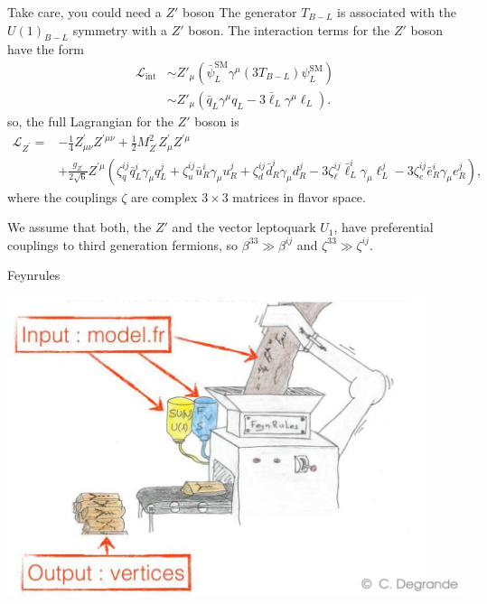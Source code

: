 \documentclass{../bredelebeamer}
\begin{document}
\begin{frame}{Take care, you could need a $Z'$ boson}
	The generator $T_{B-L}$ is associated with the $U(1)_{B-L}$ symmetry with a $Z'$ boson. The interaction terms for the $Z'$ boson have the form
	\begin{align*}
		\mathcal{L}_{\text{int}} &\sim Z'_\mu\left(\bar{\psi}_{L}^{\mathrm{SM}}\gamma^\mu (3T_{B-L}) \psi_{L}^{\mathrm{SM}}\right)\\
		&\sim Z'_\mu \left(\bar q_{L} \gamma^\mu q_{L} - 3 \bar \ell_L \gamma^\mu \ell_L\right).
	\end{align*}\pause
	so, the full Lagrangian for the $Z'$ boson is
	\begin{equation}
		\begin{aligned}
		\mathcal{L}_{Z^{\prime}}= & -\frac{1}{4} Z_{\mu \nu}^{\prime} Z^{\prime \mu \nu} +\frac{1}{2} M_{Z^{\prime}}^2 Z_\mu^{\prime} Z^{\prime \mu} \\
		& +\frac{g_{Z^{\prime}} }{2 \sqrt{6}} Z^{\prime \mu}\left(\zeta_q^{i j} \bar{q}_L^i \gamma_\mu q_L^j+\zeta_u^{i j} \bar{u}_R^i \gamma_\mu u_R^j+\zeta_d^{i j} \bar{d}_R^i \gamma_\mu d_R^j-3 \zeta_{\ell}^{i j} \bar{\ell}_L^i \gamma_\mu \ell_L^j-3 \zeta_e^{i j} \bar{e}_R^i \gamma_\mu e_R^j\right),
		\end{aligned}
	\end{equation}
	where the couplings $\zeta$ are complex $3\times 3$ matrices in flavor space.\pause

	\vfill
	We assume that both, the $Z'$ and the vector leptoquark $U_1$, have preferential couplings to third generation fermions, so $\beta^{33}\gg \beta^{ij}$ and $\zeta^{33}\gg \zeta^{ij}$.
\end{frame}

\begin{frame}{Feynrules}
	\begin{center}
		\includegraphics[width=.99\linewidth]{Feynrules.png}
	\end{center}
\end{frame}
\end{document}
